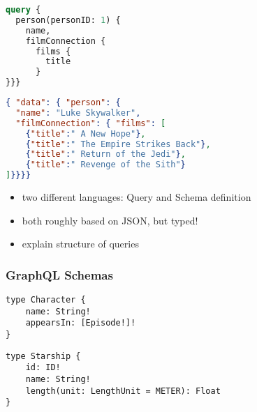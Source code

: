 \begin{listing}
    \centering
    \noindent\begin{minipage}[b]{.4\textwidth}
    \begin{lstlisting}[language=graphql]
query {
  person(personID: 1) {
    name,
    filmConnection {
      films {
        title
      }
}}}
\end{lstlisting}
        \label{lst:graphql-request}            
        \end{minipage}%
    \begin{minipage}[b]{.6\textwidth}
        \begin{lstlisting}[language=json]
{ "data": { "person": {
  "name": "Luke Skywalker",
  "filmConnection": { "films": [
    {"title":" A New Hope"},
    {"title":" The Empire Strikes Back"},
    {"title":" Return of the Jedi"},
    {"title":" Revenge of the Sith"}
]}}}}
        \end{lstlisting}
        \label{lst:graphql-response}            
    \end{minipage}
    \addtocounter{listing}{-1}
    \caption[GraphQL request to SWAPI and its response]{GraphQL request to SWAPI\footnotemark and its response}
    \label{lst:graphql}
    \end{listing}
    

\begin{itemize}
    \item two different languages: Query and Schema definition
    \item both roughly based on JSON, but typed!
    \item explain structure of queries
\end{itemize}

\subsubsection{GraphQL Schemas}

\begin{lstlisting}[caption={GraphQL type definition}, language=graphqls]
type Character {
    name: String!
    appearsIn: [Episode!]!
}
\end{lstlisting}

\begin{lstlisting}[caption={Arguments on GraphQL fields}, language=graphqls]
type Starship {
    id: ID!
    name: String!
    length(unit: LengthUnit = METER): Float
}
\end{lstlisting}

